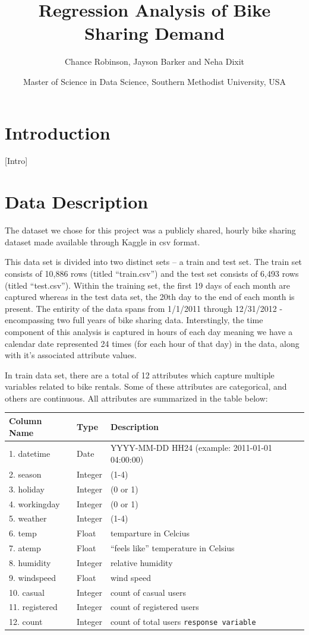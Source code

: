 \documentclass[american,]{article}
\title{Regression Analysis of Bike Sharing Demand}
\author{Chance Robinson, Jayson Barker and Neha Dixit}
\date{Master of Science in Data Science, Southern Methodist University, USA}
\begin{document}
\maketitle

\hypertarget{introduction}{%
\section{Introduction}\label{introduction}}

{[}Intro{]}

\hypertarget{data-description}{%
\section{Data Description}\label{data-description}}

The dataset we chose for this project was a publicly shared, hourly bike sharing dataset made available through Kaggle in csv format.

This data set is divided into two distinct sets -- a train and test set. The train set consists of 10,886 rows (titled ``train.csv'') and the test set consists of 6,493 rows (titled ``test.csv''). Within the training set, the first 19 days of each month are captured whereas in the test data set, the 20th day to the end of each month is present. The entirity of the data spans from 1/1/2011 through 12/31/2012 - encompassing two full years of bike sharing data. Interstingly, the time component of this analysis is captured in hours of each day meaning we have a calendar date represented 24 times (for each hour of that day) in the data, along with it's associated attribute values.

In train data set, there are a total of 12 attributes which capture multiple variables related to bike rentals. Some of these attributes are categorical, and others are continuous. All attributes are summarized in the table below:

\begin{longtable}[]{@{}lll@{}}
\toprule
Column Name & Type & Description\tabularnewline
\midrule
\endhead
1. datetime & Date & YYYY-MM-DD HH24 (example: 2011-01-01 04:00:00)\tabularnewline
2. season & Integer & (1-4)\tabularnewline
3. holiday & Integer & (0 or 1)\tabularnewline
4. workingday & Integer & (0 or 1)\tabularnewline
5. weather & Integer & (1-4)\tabularnewline
6. temp & Float & temparture in Celcius\tabularnewline
7. atemp & Float & ``feels like'' temperature in Celsius\tabularnewline
8. humidity & Integer & relative humidity\tabularnewline
9. windspeed & Float & wind speed\tabularnewline
10. casual & Integer & count of casual users\tabularnewline
11. registered & Integer & count of registered users\tabularnewline
12. count & Integer & count of total users \texttt{response\ variable}\tabularnewline
\bottomrule
\end{longtable}
\end{document}
